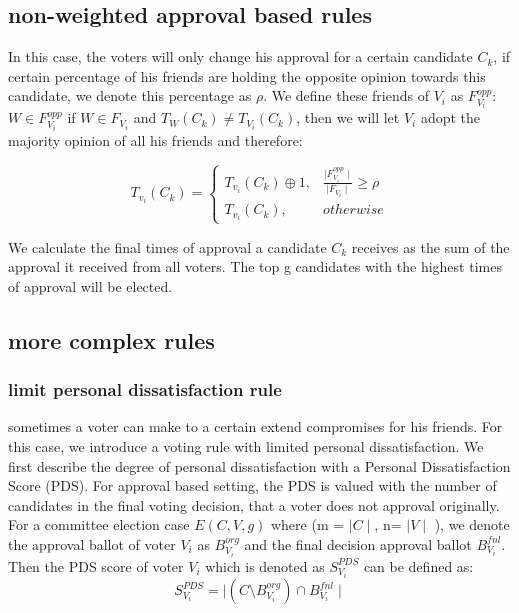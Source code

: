 \documentclass[
   a4paper,                      %
   tucfont,                      %
   english,                      %
   tuctitle,                     %
   intoc,                        %
   twoside,                      %
   captions=tableheading,        %
   openright,                    %
   final,                        %
   ]{tuc-thesis}                 %
\begin{document}
\subsection{non-weighted approval based rules}
In this case, the voters will only change his approval for a certain candidate $C_k$, if certain percentage of his friends are holding the opposite opinion towards this candidate, we denote this percentage as $\rho$. We define these friends of $V_i$ as $F^{opp}_{V_i}$: $W \in F^{opp}_{V_i}$ if $W \in F_{V_i}$ and $T_{W}(C_k) \neq T_{V_i}(C_k)$, then we will let $V_i$ adopt the majority opinion of all his friends and therefore:

\begin{equation} 
        T_{v_i}(C_k) =
        \begin{cases}
        T_{v_i}(C_k) \oplus 1, & \frac{\mid F^{opp}_{V_i} \mid}{\mid F_{V_i} \mid}\geqslant \rho \\
        T_{v_i}(C_k), &otherwise
        \end{cases}\label{NW:voter_Times}
\end{equation}

We calculate the final times of approval a candidate $C_k$ receives as the sum of the approval it received from all voters. The top g candidates with the highest times of approval will be elected.

\subsection{more complex rules}

\subsubsection{limit personal dissatisfaction rule}
sometimes a voter can make to a certain extend compromises for his friends. For this case, we introduce a voting rule with limited personal dissatisfaction. We first describe the degree of personal dissatisfaction with a Personal Dissatisfaction Score (PDS). For approval based setting, the PDS is valued with the number of candidates in the final voting decision, that a voter does not approval originally. For a committee election case  $E(C,V,g)$ where (m = $\mid C \mid$, n= $\mid V \mid$ ), we denote the approval ballot of voter $V_i$ as $B_{V_i}^{org}$ and the final decision approval ballot $B_{V_i}^{fnl}$. Then the PDS score of voter $V_i$ which is denoted as $S_{V_i}^{PDS}$ can be defined as:
\begin{equation}
S_{V_i}^{PDS}=  \mid (C \setminus B_{V_i}^{org}) \cap B_{V_i}^{fnl}  \mid
\label{CP:PDS}
\end{equation}
\end{document}
